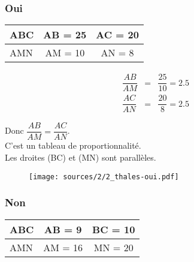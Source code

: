 \documentclass[12pt]{article}
\begin{document}
\begin{multicols}{2}

  \subsubsection*{Oui}
  
  \begin{center}
    \begin{tabular}{| l || c | c | }
      \hline
      ABC & AB = 25 & AC = 20 \\
      \hline
      AMN & AM = 10 & AN = 8  \\
      \hline
    \end{tabular}
  \end{center}
  
  \begin{multicols}{2}

    \begin{eqnarray*}
      \dfrac{AB}{AM} &=& \dfrac{25}{10} = 2.5\\
      \dfrac{AC}{AN} &=& \dfrac{20}{8} = 2.5
    \end{eqnarray*}
    
    Donc $\dfrac{AB}{AM} = \dfrac{AC}{AN}$. \\
    C'est un tableau de proportionnalité.\\
    Les droites (BC) et (MN) sont parallèles.

    \begin{figure}[H]
      \centering
      \texttt{[image: sources/2/2\_thales-oui.pdf]}
    \end{figure}

  \end{multicols}

  \subsubsection*{Non}
  
  \begin{center}
    \begin{tabular}{| l || c | c | }
      \hline
      ABC & AB = 9 & BC = 10 \\
      \hline
      AMN & AM = 16 & MN = 20  \\
      \hline
    \end{tabular}
  \end{center}
  
  \begin{multicols}{2}
  

\end{multicols}
\end{multicols}
\end{document}
